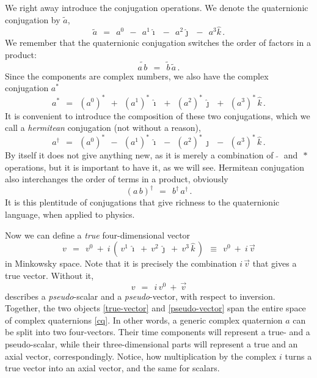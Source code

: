 \documentclass[epsfig,12pt]{article}
\newcommand{\wt}{\widetilde}
\newcommand{\ii}{\hat\imath}
\newcommand{\jj}{\hat\jmath}
\newcommand{\kk}{\hat k}
\begin{document}
	We right away introduce the conjugation operations.
	We denote the quaternionic conjugation by $ \wt a $,
\begin{equation}
	\wt a	~~=~~	a^0  ~~-~~  a^1 \ii  ~~-~~  a^2 \jj  ~~-~~ a^3 \kk\,.
\end{equation}
	We remember that the quaternionic conjugation switches the order of factors in a product:
\begin{equation}
	\wt{a\, b}  ~~=~~  \wt b\, \wt a\,.
\end{equation}
	Since the components are complex numbers, we also have the complex conjugation $ a^* $
\begin{equation}
	a^*	~~=~~	(a^0)^*  ~~+~~  (a^1)^*\, \ii  ~~+~~  (a^2)^*\, \jj  ~~+~~  (a^3)^*\, \kk\,.
\end{equation}
	It is convenient to introduce the composition of these two conjugations, which we call a \emph{hermitean}
	conjugation (not without a reason),
\begin{equation}
	a^\dag	~~=~~	(a^0)^*  ~~-~~  (a^1)^*\, \ii  ~~-~~  (a^2)^*\, \jj  ~~-~~  (a^3)^*\, \kk\,.
\end{equation}
	By itself it does not give anything new, as it is merely a combination of $ \,\wt{~}\, $ and $ \,*\, $ operations,
	but it is important to have it, as we will see.
	Hermitean conjugation also interchanges the order of terms in a product, obviously
\begin{equation}
	(a\, b)^\dag	~~=~~	b^\dag\, a^\dag\,.
\end{equation}
	It is this plentitude of conjugations that give richness to the quaternionic language, when applied to physics.

	Now we can define a \emph{true} four-dimensional vector
\begin{equation}
\label{true-vector}
	v	~~=~~	v^0  ~+~  i\,(\, v^1\,\ii  ~+~  v^2\,\jj  ~+~ v^3\,\kk \,)
		~~\equiv~~	v^0  ~+~  i\,\vec v
\end{equation}
	in Minkowsky space.
	Note that it is precisely the combination $ i\,\vec v $ that gives a true vector.
	Without it,
\begin{equation}
\label{pseudo-vector}
	v	~~=~~	i\,v^0  ~+~  \vec v
\end{equation}
	describes a \emph{pseudo}-scalar and a \emph{pseudo}-vector, with respect to inversion.
	Together, the two objects \eqref{true-vector} and \eqref{pseudo-vector} span the entire space of 
	complex quaternions \eqref{cq}.
	In other words, a generic complex quaternion $ a $ can be split into two four-vectors.
	Their time components will represent a true- and a pseudo-scalar, while their three-dimensional
	parts will represent a true and an axial vector, correspondingly.
	Notice, how multiplication by the complex $ i $ turns a true vector into an axial vector, and
	the same for scalars.
\end{document}
